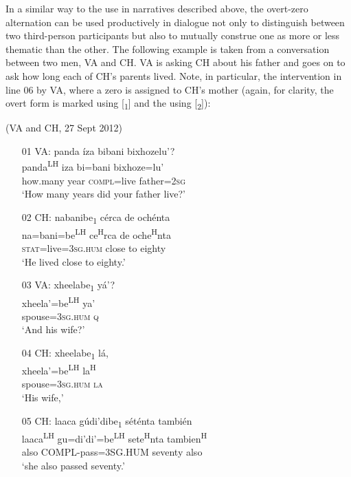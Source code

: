 In a similar way to the use in narratives described above, the overt-zero alternation can be used productively in dialogue not only to distinguish between two third-person participants but also to mutually construe one as more or less thematic than the other. The following example is taken from a conversation between two men, VA and CH. VA is asking CH about his father and goes on to ask how long each of CH's parents lived. Note, in particular, the intervention in line 06 by VA, where a zero  is assigned to CH's mother (again, for clarity, the overt form is marked using [\textsubscript{1}] and the  using [\textsubscript{2}]):

\ea (VA and CH, 27 Sept 2012)
\begin{itemize}
\item[01 VA:]
\glll panda \'{i}za bibani bixhozelu'? \\               
panda\textsuperscript{LH} iza bi=bani bixhoze=lu' \\
how.many year \textsc{compl}=live father=\textsc{2sg} \\
\glt `How many years did your father live?'
 

\item[02 CH:]
\glll nabanibe\textsubscript{1} c\'{e}rca de och\'{e}nta \\   
na=bani=be\textsuperscript{LH} ce\textsuperscript{H}rca de oche\textsuperscript{H}nta \\
\textsc{stat}=live=\textsc{3sg.hum} close to eighty \\
\glt `He lived close to eighty.'


\item[03 VA:]
\glll xheelabe\textsubscript{1} y\'{a}'? \\
xheela'=be\textsuperscript{LH} ya' \\
spouse=\textsc{3sg.hum} \textsc{q} \\
\glt `And his wife?'


\item[04 CH:]
\glll xheelabe\textsubscript{1} l\'{a}, \\
xheela'=be\textsuperscript{LH} la\textsuperscript{H} \\
spouse=\textsc{3sg.hum} \textsc{la}	\\
\glt `His wife,'


\item[05 CH:]
\glll laaca g\'{u}di'dibe\textsubscript{1} s\'{e}t\'{e}nta tambi\'{e}n \\
laaca\textsuperscript{LH} gu=di'di'=be\textsuperscript{LH} sete\textsuperscript{H}nta tambien\textsuperscript{H}  \\
also	COMPL-pass=3SG.HUM seventy also \\
\glt `she also passed seventy.'



\end{itemize}
